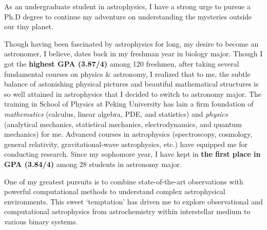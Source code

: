 As an undergraduate student in astrophysics, I have a strong urge to pursue a Ph.D degree to continue my adventure on understanding the mysteries outside our tiny planet. 

Though having been fascinated by astrophysics for long, my desire to become an astronomer, I believe, dates back in my freshman year in biology major. Though I got the \textbf{highest GPA (3.87/4)} among 120 freshmen, after taking several fundamental courses on physics \& astronomy, I realized that to me, the subtle balance of astonishing physical pictures and beautiful mathematical structures is so well attained in astrophysics that I decided to switch to astronomy major. The training in School of Physics at Peking University has lain a firm foundation of \textit{mathematics} (calculus, linear algebra, PDE, and statistics) and \textit{physics} (analytical mechanics, statistical mechanics, electrodynamics, and quantum mechanics) for me. Advanced courses in astrophysics (spectroscopy, cosmology, general relativity, gravitational-wave astrophysics, etc.) have equipped me for conducting research. Since my sophomore year, I have kept in \textbf{the first place in GPA (3.84/4)} among 28 students in astronomy major.

One of my greatest pursuits is to combine state-of-the-art observations with powerful computational methods to understand complex astrophysical environments. This sweet `temptation' has driven me to explore observational and computational astrophysics from astrochemistry within interstellar medium to various binary systems.



